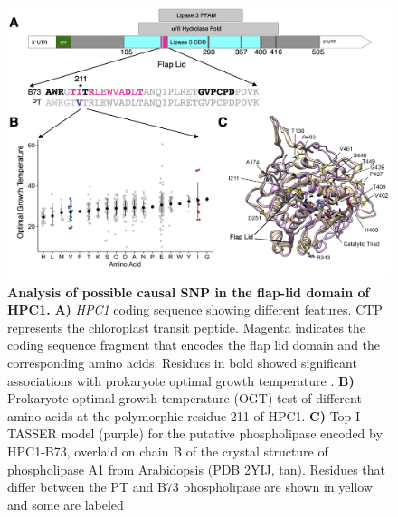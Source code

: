 \documentclass[9pt,twocolumn,twoside,lineno]{biorxiv}
\newcommand{\hpc}{\textit{HPC1}\xspace}
\begin{document}
\begin{figure}[ht]
\begin{center}
\includegraphics[width=0.4\paperwidth]{Figures/Fig_5.png}
\caption{\textbf{Analysis of possible causal SNP in the flap-lid domain of HPC1.} 
\textbf{A)} \hpc coding sequence showing different features. 
CTP represents the chloroplast transit peptide. 
Magenta indicates the coding sequence fragment that encodes the flap lid domain and the corresponding amino acids.
Residues in bold showed significant associations with prokaryote optimal growth temperature \cite{Jensen2021-iv, Jensen2021-zm}.
\textbf{B)} Prokaryote optimal growth temperature (OGT) test of different amino acids at the polymorphic residue 211 of HPC1.
\textbf{C)} Top I-TASSER model (purple) for the putative phospholipase encoded by HPC1-B73, overlaid on chain B of the crystal structure of phospholipase A1 from
Arabidopsis (PDB 2YIJ, tan). 
Residues that differ between the PT and B73 phospholipase are shown in yellow and some are labeled} 
\label{Fig5}
\end{center}
\end{figure}
\end{document}
